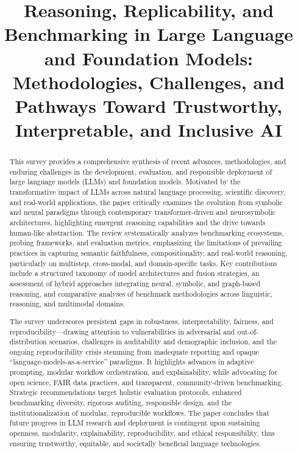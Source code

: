 \documentclass[sigconf]{acmart}
\title{Reasoning, Replicability, and Benchmarking in Large Language and Foundation Models: Methodologies, Challenges, and Pathways Toward Trustworthy, Interpretable, and Inclusive AI}
\begin{document}
\begin{abstract}
This survey provides a comprehensive synthesis of recent advances, methodologies, and enduring challenges in the development, evaluation, and responsible deployment of large language models (LLMs) and foundation models. Motivated by the transformative impact of LLMs across natural language processing, scientific discovery, and real-world applications, the paper critically examines the evolution from symbolic and neural paradigms through contemporary transformer-driven and neurosymbolic architectures, highlighting emergent reasoning capabilities and the drive towards human-like abstraction. The review systematically analyzes benchmarking ecosystems, probing frameworks, and evaluation metrics, emphasizing the limitations of prevailing practices in capturing semantic faithfulness, compositionality, and real-world reasoning, particularly on multistep, cross-modal, and domain-specific tasks. Key contributions include a structured taxonomy of model architectures and fusion strategies, an assessment of hybrid approaches integrating neural, symbolic, and graph-based reasoning, and comparative analyses of benchmark methodologies across linguistic, reasoning, and multimodal domains.

The survey underscores persistent gaps in robustness, interpretability, fairness, and reproducibility—drawing attention to vulnerabilities in adversarial and out-of-distribution scenarios, challenges in auditability and demographic inclusion, and the ongoing reproducibility crisis stemming from inadequate reporting and opaque “language-models-as-a-service” paradigms. It highlights advances in adaptive prompting, modular workflow orchestration, and explainability, while advocating for open science, FAIR data practices, and transparent, community-driven benchmarking. Strategic recommendations target holistic evaluation protocols, enhanced benchmarking diversity, rigorous auditing, responsible design, and the institutionalization of modular, reproducible workflows. The paper concludes that future progress in LLM research and deployment is contingent upon sustaining openness, modularity, explainability, reproducibility, and ethical responsibility, thus ensuring trustworthy, equitable, and societally beneficial language technologies.
\end{abstract}

\maketitle
\end{document}
